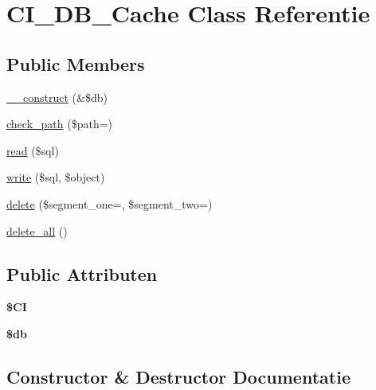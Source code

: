 \hypertarget{class_c_i___d_b___cache}{}\section{C\+I\+\_\+\+D\+B\+\_\+\+Cache Class Referentie}
\label{class_c_i___d_b___cache}
\subsection*{Public Members}
\begin{DoxyCompactItemize}
\item 
\mbox{\hyperlink{class_c_i___d_b___cache_aaf2ef772755ec6f361d44e16cc9ffd69}{\+\_\+\+\_\+construct}} (\&\$db)
\item 
\mbox{\hyperlink{class_c_i___d_b___cache_adb73b6f91025d00c565d228c4f611f41}{check\+\_\+path}} (\$path=\textquotesingle{}\textquotesingle{})
\item 
\mbox{\hyperlink{class_c_i___d_b___cache_a6e421e93555105d187d7e6ba4c84521b}{read}} (\$sql)
\item 
\mbox{\hyperlink{class_c_i___d_b___cache_a483ea50183465928c931aa17b4f4b5b8}{write}} (\$sql, \$object)
\item 
\mbox{\hyperlink{class_c_i___d_b___cache_ab97f36d9c24db4b2e91c9e02342cc994}{delete}} (\$segment\+\_\+one=\textquotesingle{}\textquotesingle{}, \$segment\+\_\+two=\textquotesingle{}\textquotesingle{})
\item 
\mbox{\hyperlink{class_c_i___d_b___cache_ac83c8ea1573fe325dfd87a282627fe6d}{delete\+\_\+all}} ()
\end{DoxyCompactItemize}
\subsection*{Public Attributen}
\begin{DoxyCompactItemize}
\item 
\mbox{\label{class_c_i___d_b___cache_ae0314d046ddf7fcfaec03222977427d3}} 
{\bfseries \$\+CI}
\item 
\mbox{\label{class_c_i___d_b___cache_a1fa3127fc82f96b1436d871ef02be319}} 
{\bfseries \$db}
\end{DoxyCompactItemize}


\subsection{Constructor \& Destructor Documentatie}
\mbox{\label{class_c_i___d_b___cache_aaf2ef772755ec6f361d44e16cc9ffd69}} 
